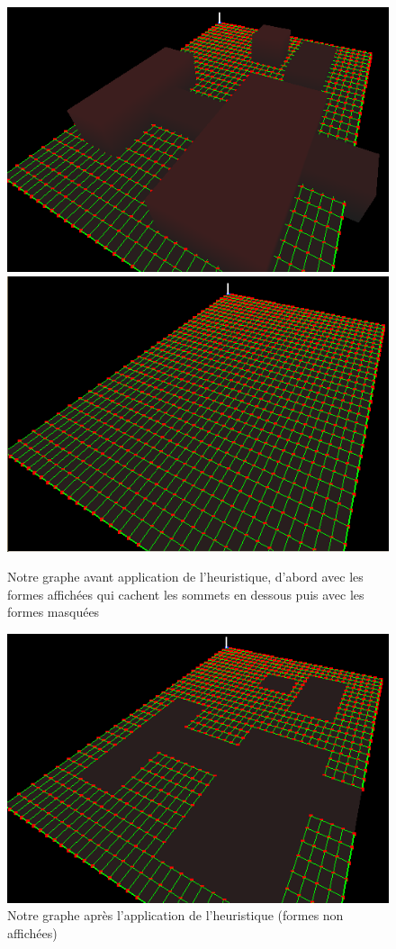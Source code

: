 \documentclass[a4paper,12pt]{report}
\begin{document}
\begin{figure}[!h]
\centering
\includegraphics[scale=0.4]{Images/heuristique1.png}
\includegraphics[scale=0.4]{Images/heuristique2.png}
\caption{Notre graphe avant application de l'heuristique, d'abord avec les formes affichées qui cachent les sommets en dessous puis avec les formes masquées}
\includegraphics[scale=0.5]{Images/heuristique3.png}
\caption{Notre graphe après l'application de l'heuristique (formes non affichées)}
\end{figure}
\vspace{0.5cm}
\end{document}
